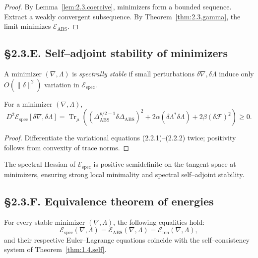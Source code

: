 \begin{proof}
By Lemma~\ref{lem:2.3.coercive}, minimizers form a bounded sequence.  
Extract a weakly convergent subsequence.  
By Theorem~\ref{thm:2.3.gamma}, the limit minimizes $\mathcal{E}_{\mathrm{ABS}}$.
\end{proof}

\subsection*{§2.3.E. Self–adjoint stability of minimizers}

\begin{definition}
A minimizer $(\nabla,\Lambda)$ is \emph{spectrally stable} if small perturbations $\delta\nabla,\delta\Lambda$ induce only $O(\|\delta\|^2)$ variation in $\mathcal{E}_{\mathrm{spec}}$.
\end{definition}

\begin{theorem}\label{thm:2.3.second}
For a minimizer $(\nabla,\Lambda)$,
\[
D^2\mathcal{E}_{\mathrm{spec}}[\delta\nabla,\delta\Lambda]
=\operatorname{Tr}_\mu\!\left(
 (\Delta_{\mathrm{ABS}}^{p/2-1}\delta\Delta_{\mathrm{ABS}})^2
 + 2\alpha (\delta\Lambda^\ast\delta\Lambda)
 + 2\beta (\delta\mathcal{F})^2
\right)\ge0.
\]
\end{theorem}

\begin{proof}
Differentiate the variational equations (2.2.1)–(2.2.2) twice; positivity follows from convexity of trace norms.
\end{proof}

\begin{corollary}
The spectral Hessian of $\mathcal{E}_{\mathrm{spec}}$ is positive semidefinite on the tangent space at minimizers, ensuring strong local minimality and spectral self–adjoint stability.
\end{corollary}

\subsection*{§2.3.F. Equivalence theorem of energies}

\begin{theorem}\label{thm:2.3.equivalence}
For every stable minimizer $(\nabla,\Lambda)$, the following equalities hold:
\[
\mathcal{E}_{\mathrm{spec}}(\nabla,\Lambda)
= \mathcal{E}_{\mathrm{ABS}}(\nabla,\Lambda)
= \mathcal{E}_{\mathrm{ren}}(\nabla,\Lambda),
\]
and their respective Euler–Lagrange equations coincide with the self–consistency system of Theorem~\ref{thm:1.4.self}.
\]
\end{theorem}

